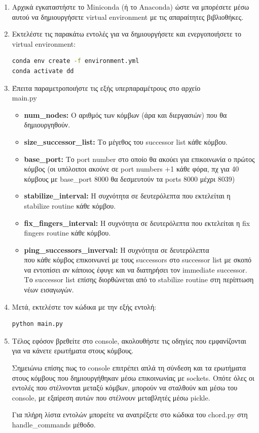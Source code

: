 \documentclass[12pt,a4paper]{article}
\begin{document}
\begin{enumerate}
	\item Αρχικά εγκαταστήστε το Miniconda (ή το Anaconda) ώστε να μπορέσετε μέσω αυτού να δημιουργήσετε virtual environment με τις απαραίτητες βιβλιοθήκες.
	\item Εκτελέστε τις παρακάτω εντολές για να δημιουργήσετε και ενεργοποιήσετε το virtual environment:
	      \begin{lstlisting}[language=Bash, breaklines=true, tabsize=2, basicstyle=\footnotesize]
conda env create -f environment.yml
conda activate dd\end{lstlisting}
	\item Έπειτα παραμετροποιήστε τις εξής υπερπαραμέτρους στο αρχείο\\main.py
	      \begin{itemize}
		      \item \textbf{num\_nodes:} Ο αριθμός των κόμβων (άρα και διεργασιών) που θα δημιουργηθούν.
		      \item \textbf{size\_successor\_list:} Το μέγεθος του successor list κάθε κόμβου.
		      \item \textbf{base\_port:} Το port number στο οποίο θα ακούει για επικοινωνία ο πρώτος κόμβος (οι υπόλοιποι ακούνε σε port numbers +1 κάθε φόρα, πχ για 40 κόμβους με base\_port 8000 θα δεσμευτούν τα ports 8000 μέχρι 8039)
		      \item \textbf{stabilize\_interval:} Η συχνότητα σε δευτερόλεπτα που εκτελείται η stabilize routine κάθε κόμβου.
		      \item \textbf{fix\_fingers\_interval:} Η συχνότητα σε δευτερόλεπτα που εκτελείται η fix fingers routine κάθε κόμβου.
		      \item \textbf{ping\_successors\_inverval:} Η συχνότητα σε δευτερόλεπτα\\που κάθε κόμβος επικοινωνεί με τους successors στο successor list με σκοπό να εντοπίσει αν κάποιος έφυγε και να διατηρήσει τον immediate successor. Το successor list επίσης διορθώνεται από το stabilize routine στη περίπτωση νέων εισαγωγών.
	      \end{itemize}
	\item Μετά, εκτελέστε τον κώδικα με την εξής εντολή:
	      \begin{lstlisting}[language=Bash, breaklines=true, tabsize=2, basicstyle=\footnotesize]
python main.py\end{lstlisting}
	\item Τέλος εφόσον βρεθείτε στο console, ακολουθήστε τις οδηγίες που εμφανίζονται για να κάνετε ερωτήματα στους κόμβους.

	      Σημειώνω επίσης πως το console επιτρέπει απλά τη σύνδεση και τα ερωτήματα στους κόμβους που δημιουργήθηκαν μέσω επικοινωνίας με sockets. Οπότε όλες οι εντολές που στέλνονται μεταξύ κόμβων, μπορούν να σταλθούν και μέσω του console, με εξαίρεση αυτών που στέλνουν μεταβλητές μέσω pickle.

	      Για πλήρη λίστα εντολών μπορείτε να ανατρέξετε στο κώδικα του chord.py στη handle\_commands μέθοδο.
\end{enumerate}
\end{document}
